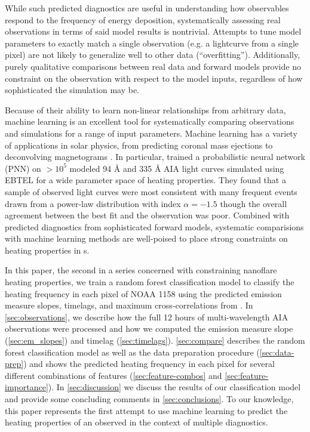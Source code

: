 While such predicted diagnostics are useful in understanding how observables respond to the frequency of energy deposition, systematically assessing real observations in terms of said model results is nontrivial. Attempts to tune model parameters to exactly match a single observation (e.g. a lightcurve from a single pixel) are not likely to generalize well to other data (``overfitting''). Additionally, purely qualitative comparisons between real data and forward models provide no constraint on the observation with respect to the model inputs, regardless of how sophisticated the simulation may be.

Because of their ability to learn non-linear relationships from arbitrary data, machine learning  is an excellent tool for systematically comparing observations and simulations for a range of input parameters. Machine learning has a variety of applications in solar physics, from predicting coronal mass ejections \citep[e.g.][]{bobra_predicting_2016} to deconvolving magnetograms \citep{baso_enhancing_2018}. In particular, \citet{tajfirouze_time-resolved_2016} trained a probabilistic neural network (PNN) on  $>10^5$ modeled 94 \AA{} and 335 \AA{} AIA light curves simulated using EBTEL for a wide parameter space of heating properties. They found that a sample of observed light curves were most consistent with many frequent events drawn from a power-law distribution with index $\alpha=-1.5$ though the overall agreement between the best fit and the observation was poor. Combined with predicted diagnostics from sophisticated forward models, systematic comparisions with machine learning methods are well-poised to place strong constraints on heating properties in \AR s.

In this paper, the second in a series concerned with constraining nanoflare heating properties, we train a random forest classification model to classify the heating frequency in each pixel of \AR{} NOAA 1158 using the predicted emission measure slopes, timelags, and maximum cross-correlations from . In \autoref{sec:observations}, we describe how the full 12 hours of multi-wavelength AIA observations were processed and how we computed the emission measure slope (\autoref{sec:em_slopes}) and timelag (\autoref{sec:timelags}). \autoref{sec:compare} describes the random forest classification model as well as the data preparation procedure (\autoref{sec:data-prep}) and shows the predicted heating frequency in each pixel for several different combinations of features (\autoref{sec:feature-combos} and \ref{sec:feature-importance}). In \autoref{sec:discussion} we discuss the results of our classification model and provide some concluding comments in \autoref{sec:conclusions}. To our knowledge, this paper represents the first attempt to use machine learning to predict the heating properties of an observed \AR{} in the context of multiple diagnostics.